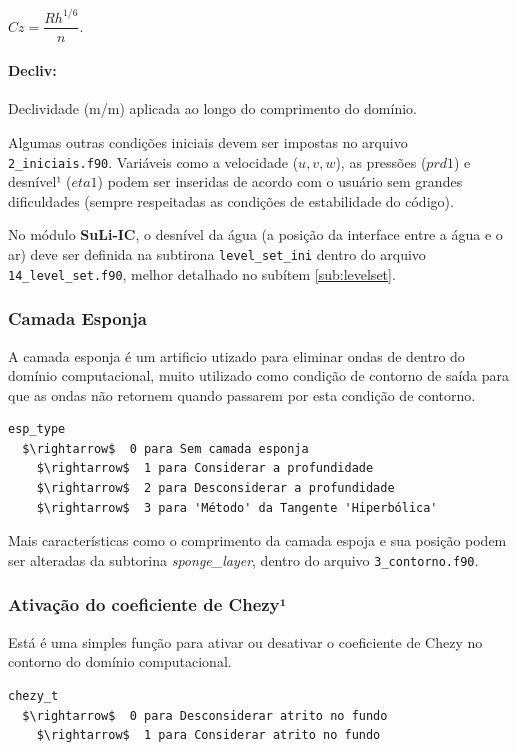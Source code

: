 \documentclass[12pt, a4paper]{article}
\newcommand{\SLIC}{{\bf SuLi-IC}}
\begin{document}
\begin{center}
$Cz = \dfrac{Rh^{1/6}}{n}.$
\end{center}

\paragraph{Decliv:} Declividade (m/m) aplicada ao longo do comprimento do domínio.
\linebreak

Algumas outras condições iniciais devem ser impostas no arquivo \verb|2_iniciais.f90|. Variáveis como a velocidade ($u,v,w$), as pressões ($prd1$) e desnível¹ ($eta1$)  podem ser inseridas de acordo com o usuário sem grandes dificuldades (sempre respeitadas as condições de estabilidade do código).

No módulo \SLIC, o desnível da água (a posição da interface entre a água e o ar) deve ser definida na subtirona \verb|level_set_ini| dentro do arquivo \verb|14_level_set.f90|, melhor detalhado no subítem \ref{sub:levelset}.


\subsubsection{Camada Esponja}

A camada esponja é um artificio utizado para eliminar ondas de dentro do domínio computacional, muito utilizado como condição de contorno de saída para que as ondas não retornem quando passarem por esta condição de contorno.

\begin{lstlisting}[escapeinside='']
esp_type
  $\rightarrow$  0 para Sem camada esponja
	$\rightarrow$  1 para Considerar a profundidade
	$\rightarrow$  2 para Desconsiderar a profundidade
	$\rightarrow$  3 para 'Método' da Tangente 'Hiperbólica'
\end{lstlisting}	

Mais características como o comprimento da camada espoja e sua posição podem ser alteradas da subtorina \textit{sponge\_layer}, dentro do arquivo \verb|3_contorno.f90|.


\subsubsection{Ativação do coeficiente de Chezy¹}
Está é uma simples função para ativar ou desativar o coeficiente de Chezy no contorno do domínio computacional.
	
\begin{lstlisting}[escapeinside='']
chezy_t	
  $\rightarrow$  0 para Desconsiderar atrito no fundo
	$\rightarrow$  1 para Considerar atrito no fundo
\end{lstlisting}
\end{document}
